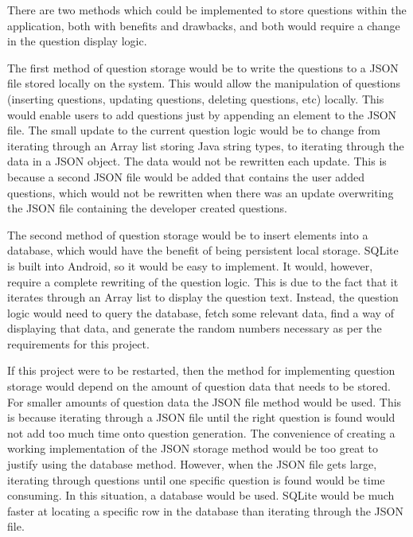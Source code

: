 \documentclass{article}
\begin{document}
There are two methods which could be implemented to store questions within the application, both with benefits and drawbacks, and both would require a change in the question display logic. \par

The first method of question storage would be to write the questions to a JSON file stored locally on the system. This would allow the manipulation of questions (inserting questions, updating questions, deleting questions, etc) locally. This would enable users to add questions just by appending an element to the JSON file. The small update to the current question logic would be to change from iterating through an Array list storing Java string types, to iterating through the data in a JSON object. The data would not be rewritten each update. This is because a second JSON file would be added that contains the user added questions, which would not be rewritten when there was an update overwriting the JSON file containing the developer created questions. \par

The second method of question storage would be to insert elements into a database, which would have the benefit of being persistent local storage. SQLite is built into Android, so it would be easy to implement. It would, however, require a complete rewriting of the question logic. This is due to the fact that it iterates through an Array list to display the question text. Instead, the question logic would need to query the database, fetch some relevant data, find a way of displaying that data, and generate the random numbers necessary as per the requirements for this project. \par

If this project were to be restarted, then the method for implementing question storage would depend on the amount of question data that needs to be stored. For smaller amounts of question data the JSON file method would be used. This is because iterating through a JSON file until the right question is found would not add too much time onto question generation. The convenience of creating a working implementation of the JSON storage method would be too great to justify using the database method. However, when the JSON file gets large, iterating through questions until one specific question is found would be time consuming. In this situation, a database would be used. SQLite would be much faster at locating a specific row in the database than iterating through the JSON file. \par
\end{document}
